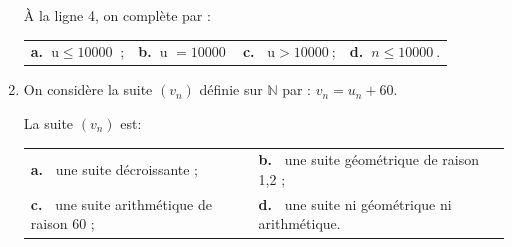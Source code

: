 \documentclass[10pt]{article}
\providecommand{\N}{\mathbb{N}}
\providecommand{\np}[2][]{{#2~#1}}
\begin{document}
\begin{enumerate}
À la ligne 4, on complète par :

\begin{center}
\begin{tabularx}{\linewidth}{*{4}{X}}
\textbf{a.~}u$\leqslant \np{10000}$ ; &\textbf{b.~}u $=\np{10000}$ &\textbf{c.~} u$> \np{10000}$;&\textbf{d.~}$n\leqslant \np{10000}$.\\
\end{tabularx}
\end{center}

\item On considère la suite $\left(v_n\right)$ définie sur $\N$ par : $v_n = u_n + 60$. 

La suite $\left(v_n\right)$ est:

\begin{center}
\begin{tabularx}{\linewidth}{*{2}{X}}
\textbf{a.~} une suite décroissante ; &\textbf{b.~} une suite géométrique de raison 1,2 ;\\
\textbf{c.~} une suite arithmétique de raison $60$ ;&\textbf{d.~} une suite ni géométrique ni arithmétique.
\end{tabularx}
\end{center}
\end{enumerate}

\bigskip
\end{document}
